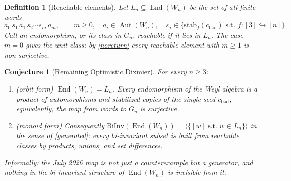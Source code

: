 \documentclass[11pt]{article}
\theoremstyle{change}
\newtheorem{definition}[equation]{Definition}
\newtheorem{conj}[equation]{Conjecture}
\theoremstyle{nonumberplain}
\numberwithin{equation}{section}
\newcommand\mono{\hookrightarrow}
\newcommand\st{{\textrm{ s.t.\ }}}
\newcommand\setof[1]{\{ #1 \}}
\DeclareMathOperator{\End}{End}
\DeclareMathOperator{\Aut}{Aut}
\begin{document}
\begin{definition}[Reachable elements]
Let $L_n \subseteq \End(W_n)$ be the set of all finite words
\begin{equation*}
a_0 \, s_1 \, a_1 \, s_2 \cdots s_m \, a_m, \qquad m \geq 0, \quad a_i \in \Aut(W_n), \quad s_j \in \setof{ \mathrm{stab}_f(c_{\text{bad}}) \st f: [3] \mono [n] }.
\end{equation*}
Call an endomorphism, or its class in $G_n$, \emph{reachable} if it lies in $L_n$. The case $m = 0$ gives the unit class; by \cref{noreturn} every reachable element with $m \geq 1$ is non-surjective.
\end{definition}

\begin{conj}[Remaining Optimistic Dixmier\label{ROD}]
For every $n \geq 3$:
\begin{enumerate}
\item (orbit form) $\End(W_n) = L_n$. Every endomorphism of the Weyl algebra is a product of automorphisms and stabilized copies of the single seed $c_{\text{bad}}$; equivalently, the map from words to $G_n$ is surjective.
\item (monoid form) Consequently $\text{BiInv}(\End(W_n)) = \langle \setof{[w] \st w \in L_n} \rangle$ in the sense of \cref{generated}: every bi-invariant subset is built from reachable classes by products, unions, and set differences.
\end{enumerate}
Informally: the July 2026 map is not just a counterexample but a generator, and nothing in the bi-invariant structure of $\End(W_n)$ is invisible from it.
\end{conj}
\end{document}
